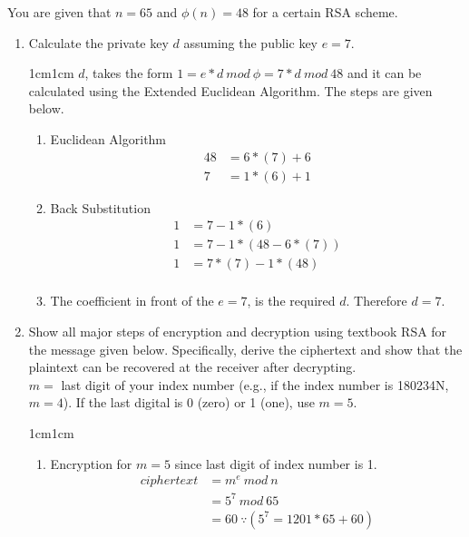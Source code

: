 \documentclass[11pt,letterpaper]{article}
\newenvironment{answer}{\em \color{blue} \begin{adjustwidth}{1cm}{1cm}}{\end{adjustwidth}}
\begin{document}
	You are given that $n=65$ and $\phi(n)=48$ for a certain RSA scheme.
	\begin{enumerate}
		\item Calculate the private key $d$ assuming the public key $e=7$.
		
		\begin{answer}
			$d$, takes the form $1 = e*d~mod ~\phi = 7*d~mod ~48$ and it can be calculated using the Extended Euclidean Algorithm. The steps are given below.
			
			\begin{enumerate}
				\item Euclidean Algorithm
				\[
				\begin{split}
					48 &= 6*\left(7\right) + 6\\
					7 &= 1*\left(6\right) + 1
				\end{split}
				\]
				
				\item Back Substitution
				\[
				\begin{split}
					1 &= 7 - 1*\left(6\right)\\
					1 &= 7 - 1*\left(48 - 6*\left(7\right) \right) \\
					1 &= 7*\left(7\right) - 1*\left(48\right)\\
				\end{split}
				\]
				
				\item The coefficient in front of the $e = 7$, is the required $d$. Therefore $d = 7$.
			\end{enumerate}					
			
		\end{answer}
		
		\item Show all major steps of encryption and decryption using textbook RSA for the message given below. Specifically, derive the ciphertext and show that the plaintext can be recovered at the receiver after decrypting.\\
		$m=$ last digit of your index number (e.g., if the index number is 180234N, $m=4$). If the last digital is 0 (zero) or 1 (one), use $m=5$. 
		\begin{answer}					
		\begin{enumerate}
			\item Encryption for $m=5$ since last digit of index number is 1. 
			\[
			\begin{split}
				ciphertext &= m^e ~mod ~n\\
				&= 5^7~mod~65 \\
				&=60 ~ \because (5^7 = 1201*65 + 60)
			\end{split}
			\]
			

\end{enumerate}
\end{answer}
\end{enumerate}
\end{document}
